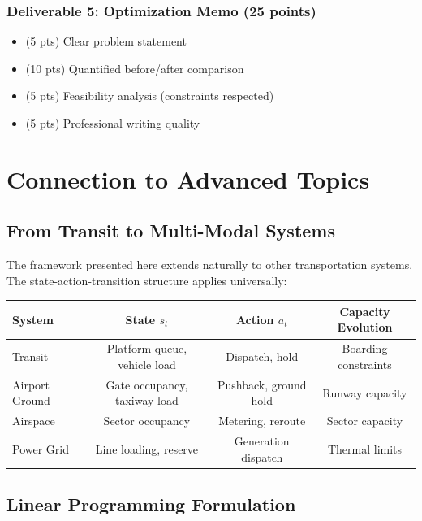 \documentclass[11pt,letterpaper]{article}
\begin{document}
\subsubsection*{Deliverable 5: Optimization Memo (25 points)}
\begin{itemize}[nosep]
    \item (5 pts) Clear problem statement
    \item (10 pts) Quantified before/after comparison
    \item (5 pts) Feasibility analysis (constraints respected)
    \item (5 pts) Professional writing quality
\end{itemize}

\section{Connection to Advanced Topics}

\subsection{From Transit to Multi-Modal Systems}

The framework presented here extends naturally to other transportation systems. The state-action-transition structure applies universally:

\begin{center}
\begin{tabular}{lccc}
\toprule
\textbf{System} & \textbf{State $s_t$} & \textbf{Action $a_t$} & \textbf{Capacity Evolution} \\
\midrule
Transit & Platform queue, vehicle load & Dispatch, hold & Boarding constraints \\
Airport Ground & Gate occupancy, taxiway load & Pushback, ground hold & Runway capacity \\
Airspace & Sector occupancy & Metering, reroute & Sector capacity \\
Power Grid & Line loading, reserve & Generation dispatch & Thermal limits \\
\bottomrule
\end{tabular}
\end{center}

\subsection{Linear Programming Formulation}
\end{document}
